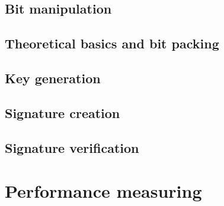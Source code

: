 \subsection{Bit manipulation}
\label{subsec:dil_bit_man}


\subsection{Theoretical basics and bit packing}
\label{subsec:dil_bit_pack}


\subsection{Key generation}
\label{subsec:dil_keygen}


\subsection{Signature creation}
\label{subsec:dil_sign}


\subsection{Signature verification}
\label{subsec:dil_verify}


\section{Performance measuring}
\label{sec:lattice_performance_measuring}


